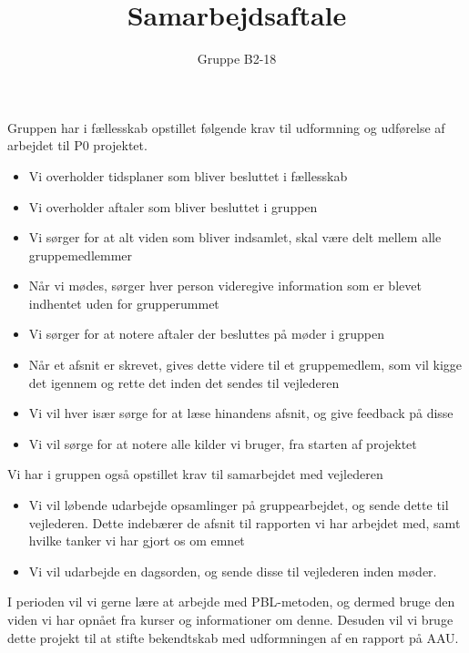 \documentclass{article}
\begin{document}
	\title{Samarbejdsaftale}
	\author{Gruppe B2-18}
	\maketitle
	Gruppen har i fællesskab opstillet følgende krav til udformning og udførelse af arbejdet til P0 projektet.
	
	\begin{itemize}
		\item Vi overholder tidsplaner som bliver besluttet i fællesskab
		\item Vi overholder aftaler som bliver besluttet i gruppen
		\item Vi sørger for at alt viden som bliver indsamlet, skal være delt mellem alle gruppemedlemmer
		\item Når vi mødes, sørger hver person videregive information som er blevet indhentet uden for grupperummet
		\item Vi sørger for at notere aftaler der besluttes på møder i gruppen
		\item Når et afsnit er skrevet, gives dette videre til et gruppemedlem, som vil kigge det igennem og rette det inden det sendes til vejlederen
		\item Vi vil hver især sørge for at læse hinandens afsnit, og give feedback på disse
		\item Vi vil sørge for at notere alle kilder vi bruger, fra starten af projektet
	\end{itemize}

	Vi har i gruppen også opstillet krav til samarbejdet med vejlederen

	\begin{itemize}
		\item Vi vil løbende udarbejde opsamlinger på gruppearbejdet, og sende dette til vejlederen. Dette indebærer de afsnit til rapporten vi har arbejdet med, samt hvilke tanker vi har gjort os om emnet
		\item Vi vil udarbejde en dagsorden, og sende disse til vejlederen inden møder.
	\end{itemize}

	I perioden vil vi gerne lære at arbejde med PBL-metoden, og dermed bruge den viden vi har opnået fra kurser og informationer om denne. Desuden vil vi bruge dette projekt til at stifte bekendtskab med udformningen af en rapport på AAU.
\end{document}
